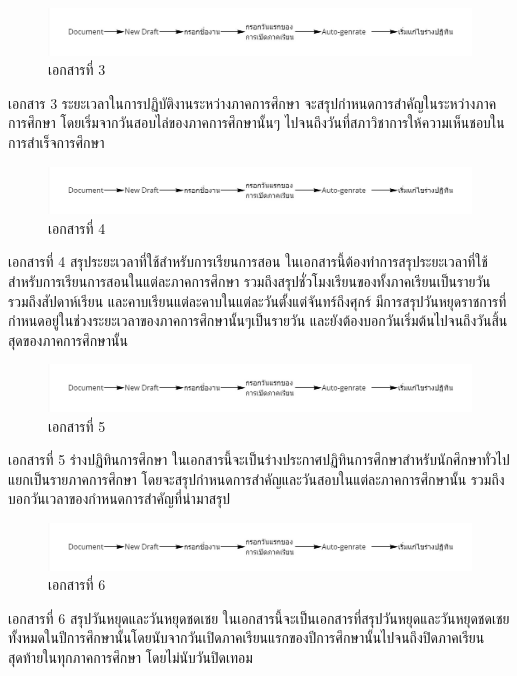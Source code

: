 \begin{figure}[h]
    \centering
    \includegraphics[width=1\textwidth]{pic3.1.jpg}
    \caption{เอกสารที่ 3}
    \label{fig: conclude-per-semester}
\end{figure}
\par เอกสาร 3 ระยะเวลาในการปฏิบัติงานระหว่างภาคการศึกษา
จะสรุปกำหนดการสำคัญในระหว่างภาคการศึกษา โดยเริ่มจากวันสอบไล่ของภาคการศึกษานั้นๆ ไปจนถึงวันที่สภาวิชาการให้ความเห็นชอบในการสำเร็จการศึกษา


\begin{figure}[h]
    \centering
    \includegraphics[width=1\textwidth]{pic3.1.jpg}
    \caption{เอกสารที่ 4}
    \label{fig: conclude-study-week}
\end{figure}
\par เอกสารที่ 4 สรุประยะเวลาที่ใช้สำหรับการเรียนการสอน
ในเอกสารนี้ต้องทำการสรุประยะเวลาที่ใช้สำหรับการเรียนการสอนในแต่ละภาคการศึกษา รวมถึงสรุปชั่วโมงเรียนของทั้งภาคเรียนเป็นรายวัน รวมถึงสัปดาห์เรียน และคาบเรียนแต่ละคาบในแต่ละวันตั้งแต่จันทร์ถึงศุกร์ มีการสรุปวันหยุดราชการที่กำหนดอยู่ในช่วงระยะเวลาของภาคการศึกษานั้นๆเป็นรายวัน และยังต้องบอกวันเริ่มต้นไปจนถึงวันสิ้นสุดของภาคการศึกษานั้น

\begin{figure}[h]
    \centering
    \includegraphics[width=1\textwidth]{pic3.1.jpg}
    \caption{เอกสารที่ 5}
    \label{fig: academic-calendar-draft}
\end{figure}
\par เอกสารที่ 5 ร่างปฏิทินการศึกษา
ในเอกสารนี้จะเป็นร่างประกาศปฏิทินการศึกษาสำหรับนักศึกษาทั่วไปแยกเป็นรายภาคการศึกษา โดยจะสรุปกำหนดการสำคัญและวันสอบในแต่ละภาคการศึกษานั้น รวมถึงบอกวันเวลาของกำหนดการสำคัญที่นำมาสรุป

\begin{figure}[h]
    \centering
    \includegraphics[width=1\textwidth]{pic3.1.jpg}
    \caption{เอกสารที่ 6}
    \label{fig: holiday-draft}
\end{figure}
\par เอกสารที่ 6 สรุปวันหยุดและวันหยุดชดเชย
ในเอกสารนี้จะเป็นเอกสารที่สรุปวันหยุดและวันหยุดชดเชยทั้งหมดในปีการศึกษานั้นโดยนับจากวันเปิดภาคเรียนแรกของปีการศึกษานั้นไปจนถึงปิดภาคเรียนสุดท้ายในทุกภาคการศึกษา โดยไม่นับวันปิดเทอม


